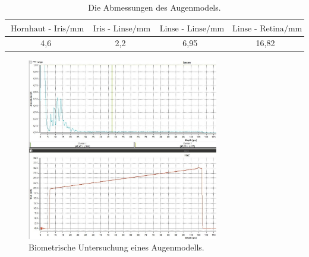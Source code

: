 \begin{table}[H]
    \centering
    \caption{Die Abmessungen des Augenmodels.} 
    \label{Tabelle7}
    \begin{tabular} {c  c  c  c}
        \toprule
        {$ \text{Hornhaut - Iris} \mathbin{/} \unit{\milli\meter}$} &
        {$ \text{Iris - Linse}    \mathbin{/} \unit{\milli\meter} $} &
        {$ \text{Linse - Linse}   \mathbin{/} \unit{\milli\meter} $} &
        {$ \text{Linse - Retina}  \mathbin{/} \unit{\milli\meter} $} \\
        \midrule
        4,6 & 2,2 & 6,95 & 16,82 \\
        \bottomrule
    \end{tabular} 
\end{table}

\begin{figure}[H]
    \centering
    \includegraphics[height=80mm]{bilder/AUGE RICHTIG.jpg}
    \caption{Biometrische Untersuchung eines Augenmodells. \label{Abbildung6} }
\end{figure}